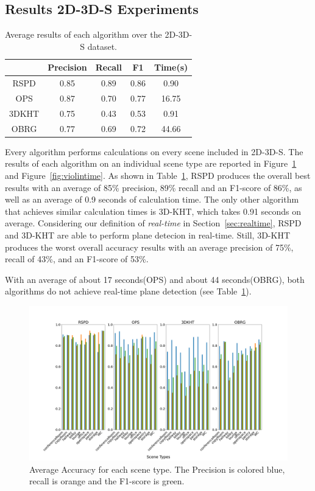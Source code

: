\documentclass[main.tex]{subfiles}
\begin{document}
\subsection{Results 2D-3D-S Experiments}
\begin{table}[H]
    \centering
    \begin{tabular}{c|cccc}
              & Precision & Recall & F1   & Time(s) \\ \hline
        RSPD  & 0.85      & 0.89   & 0.86 & 0.90    \\
        OPS   & 0.87      & 0.70   & 0.77 & 16.75   \\
        3DKHT & 0.75      & 0.43   & 0.53 & 0.91    \\
        OBRG  & 0.77      & 0.69   & 0.72 & 44.66
    \end{tabular}
    \caption[Overall 2D-3D-S Results]{Average results of each algorithm over the 2D-3D-S dataset.}
    \label{tab:algo-acc}
\end{table}

Every algorithm performs calculations on every scene included in 2D-3D-S.
The results of each algorithm on an individual scene type are reported in Figure~\ref{fig:stanfordaccuracy} and Figure~\ref{fig:violintime}. As shown in Table~\ref{tab:algo-acc},
RSPD produces the overall best results with an average of 85\% precision, 89\% recall and an F1-score of 86\%, as well as an average of 0.9 seconds of calculation time.
The only other algorithm that achieves similar calculation times is 3D-KHT, which takes 0.91 seconds on average. Considering our definition of \textit{real-time} in Section~\ref{sec:realtime},
RSPD and 3D-KHT are able to perform plane detecion in real-time. Still, 3D-KHT produces the worst overall accuracy results with an average precision of 75\%, recall of 43\%, and an F1-score of 53\%.

With an average of about 17 seconds(OPS) and about 44 seconds(OBRG), both algorithms do not achieve real-time plane detection (see Table~\ref{tab:algo-acc}).


\begin{figure}[]
    \centering
    \includegraphics[width=15 cm]{images/accuracy_total.png}
    \caption[Accuracy Results 2D-3D-S]{Average Accuracy for each scene type. The Precision
        is colored blue, recall is orange and the F1-score is green.}
    \label{fig:stanfordaccuracy}
\end{figure}
\end{document}

